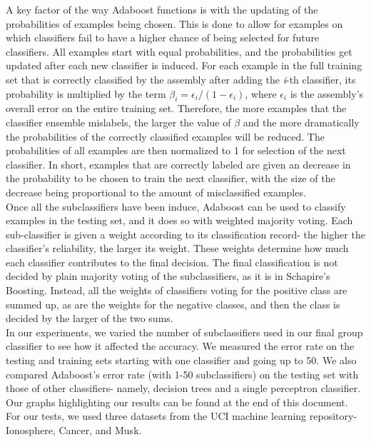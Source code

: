 \documentclass{article}
\begin{document}
A key factor of the way Adaboost functions is with the updating of the probabilities of examples being chosen. This is done to allow for examples on which classifiers fail to have a higher chance of being selected for future classifiers. All examples start with equal probabilities, and the probabilities get updated after each new classifier is induced. For each example in the full training set that is correctly classified by the assembly after adding the \textit{i}-th classifier, its probability is multiplied by the term $\beta_i = \epsilon_i / (1 - \epsilon_i)$, where $\epsilon_i$ is the assembly's overall error on the entire training set. Therefore, the more examples that the classifier ensemble mislabels, the larger the value of $\beta$ and the more dramatically the probabilities of the correctly classified examples will be reduced. The probabilities of all examples are then normalized to 1 for selection of the next classifier. In short, examples that are correctly labeled are given an decrease in the probability to be chosen to train the next classifier, with the size of the decrease being proportional to the amount of misclassified examples. \\

Once all the subclassifiers have been induce, Adaboost can be used to classify examples in the testing set, and it does so with weighted majority voting. Each sub-classifier is given a weight according to its classification record- the higher the classifier's reliability, the larger its weight. These weights determine how much each classifier contributes to the final decision. The final classification is not decided by plain majority voting of the subclassifiers, as it is in Schapire's Boosting. Instead, all the weights of classifiers voting for the positive class are summed up, as are the weights for the negative classes, and then the class is decided by the larger of the two sums. \\

In our experiments, we varied the number of subclassifiers used in our final group classifier to see how it affected the accuracy. We measured the error rate on the testing and training sets starting with one classifier and going up to 50. We also compared Adaboost's error rate (with 1-50 subclassifiers) on the testing set with those of other classifiers- namely, decision trees and a single perceptron classifier. Our graphs highlighting our results can be found at the end of this document. For our tests, we used three datasets from the UCI machine learning repository- Ionosphere, Cancer, and Musk.
\end{document}
